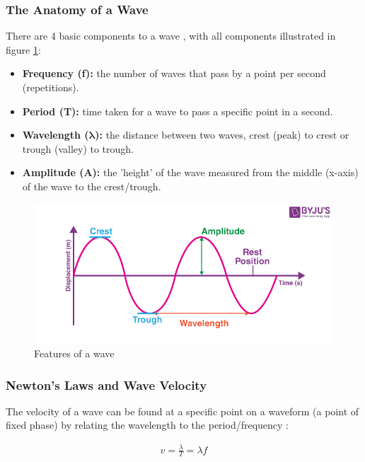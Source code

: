 \documentclass[12pt]{article}
\begin{document}
\newpage
\subsubsection{The Anatomy of a Wave}

There are 4 basic components to a wave \cite{wavebyju,waveffden}, with all components illustrated in figure \ref{fig:waveprop}:

\begin{itemize}
    \item \textbf{Frequency (f):} the number of waves that pass by a point per second (repetitions).
    \item \textbf{Period (T):} time taken for a wave to pass a specific point in a second.
    \item \textbf{Wavelength ($\mathbf{\lambda}$):} the distance between two waves, crest (peak) to crest or trough (valley) to trough.
    \item \textbf{Amplitude (A):} the 'height' of the wave measured from the middle (x-axis) of the wave to the crest/trough.
\end{itemize}

\begin{figure}[H]
    \centering
    \includegraphics[width=14cm]{wave.png}
    \caption{\centering Features of a wave \protect\cite{wavebyju}}
    \label{fig:waveprop}
\end{figure}


\subsubsection{Newton's Laws and Wave Velocity}

The velocity of a wave can be found at a specific point on a waveform (a point of fixed phase) by relating the wavelength to the period/frequency \cite{geekwave,librewave}:

\vspace{-1.5ex}
\begin{gather} \label{eq:1}
    v = \frac{\lambda}{T} = \lambda f
\end{gather}
\end{document}
